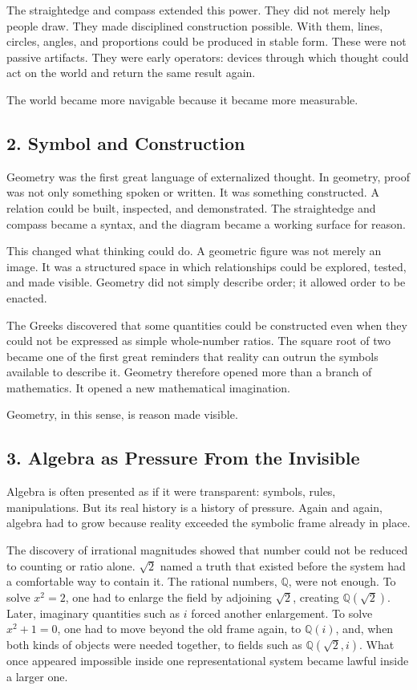 \documentclass[
]{article}
\begin{document}
The straightedge and compass extended this power. They did not merely
help people draw. They made disciplined construction possible. With
them, lines, circles, angles, and proportions could be produced in
stable form. These were not passive artifacts. They were early
operators: devices through which thought could act on the world and
return the same result again.

The world became more navigable because it became more measurable.

\hypertarget{symbol-and-construction}{%
\subsection{2. Symbol and Construction}\label{symbol-and-construction}}

Geometry was the first great language of externalized thought. In
geometry, proof was not only something spoken or written. It was
something constructed. A relation could be built, inspected, and
demonstrated. The straightedge and compass became a syntax, and the
diagram became a working surface for reason.

This changed what thinking could do. A geometric figure was not merely
an image. It was a structured space in which relationships could be
explored, tested, and made visible. Geometry did not simply describe
order; it allowed order to be enacted.

The Greeks discovered that some quantities could be constructed even
when they could not be expressed as simple whole-number ratios. The
square root of two became one of the first great reminders that reality
can outrun the symbols available to describe it. Geometry therefore
opened more than a branch of mathematics. It opened a new mathematical
imagination.

Geometry, in this sense, is reason made visible.

\hypertarget{algebra-as-pressure-from-the-invisible}{%
\subsection{3. Algebra as Pressure From the
Invisible}\label{algebra-as-pressure-from-the-invisible}}

Algebra is often presented as if it were transparent: symbols, rules,
manipulations. But its real history is a history of pressure. Again and
again, algebra had to grow because reality exceeded the symbolic frame
already in place.

The discovery of irrational magnitudes showed that number could not be
reduced to counting or ratio alone. \(\sqrt{2}\) named a truth that
existed before the system had a comfortable way to contain it. The
rational numbers, \(\mathbb{Q}\), were not enough. To solve \(x^2 = 2\),
one had to enlarge the field by adjoining \(\sqrt{2}\), creating
\(\mathbb{Q}(\sqrt{2})\). Later, imaginary quantities such as \(i\)
forced another enlargement. To solve \(x^2 + 1 = 0\), one had to move
beyond the old frame again, to \(\mathbb{Q}(i)\), and, when both kinds
of objects were needed together, to fields such as
\(\mathbb{Q}(\sqrt{2}, i)\). What once appeared impossible inside one
representational system became lawful inside a larger one.
\end{document}
